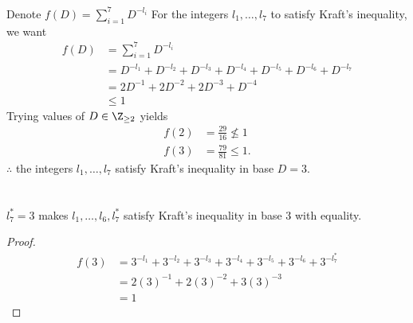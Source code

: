 \documentclass[
  coursecode={MTHE 474},
  assignmentname={Homework \homeworknumber},
  studentnumber=20053722,
  name={Bryan Hoang},
  draft,
]{
  ltxanswer%
}
\begin{document}
  \begin{questions}
    \setcounter{question}{\questionnumber}
    \addtocounter{question}{-1}
    \question[15]\
    \begin{parts}
      \part{}
      \begin{solution}
        Denote \(f(D)=\sum_{i=1}^{7} D^{-l_{i}}\) For the integers \(l_{1},\dotsc,l_{7}\) to satisfy Kraft's inequality, we want
        \begin{align*}
          f(D) &= \sum_{i=1}^{7} D^{-l_{i}}                                                                \\
               &= D^{-l_{1}} + D^{-l_{2}} + D^{-l_{3}} + D^{-l_{4}} + D^{-l_{5}} + D^{-l_{6}} + D^{-l_{7}} \\
               &= 2D^{-1} + 2D^{-2} + 2D^{-3} + D^{-4}                                                     \\
               &\le 1
        \end{align*}
        Trying values of \(D \in \Z_{\ge2}\) yields
        \begin{align*}
          f(2) &= \frac{29}{16} \nleq 1 \\
          f(3) &= \frac{79}{81} \leq 1.
        \end{align*}
        \(\therefore\) the integers \(l_{1},\dotsc,l_{7}\) satisfy Kraft's inequality in base \(\boxed{D=3}\).
      \end{solution}

      \part{}
      \begin{solution}
        \begin{claim}
          \(\boxed{l_{7}^{*}=3}\) makes \(l_{1},\dotsc,l_{6},l_{7}^{*}\) satisfy Kraft's inequality in base 3 with equality.
        \end{claim}
        \begin{proof}
          \begin{align*}
            f(3) &= 3^{-l_{1}} + 3^{-l_{2}} + 3^{-l_{3}} + 3^{-l_{4}} + 3^{-l_{5}} + 3^{-l_{6}} + 3^{-l_{7}^{*}} \\
                 &= 2(3)^{-1} + 2(3)^{-2} + 3(3)^{-3}                                                            \\
                 &= 1
          \end{align*}
        \end{proof}
      \end{solution}


\end{parts}
\end{questions}
\end{document}
